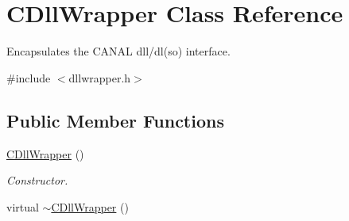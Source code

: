 \hypertarget{class_c_dll_wrapper}{
\section{CDllWrapper Class Reference}
\label{de/d52/class_c_dll_wrapper}
}


Encapsulates the CANAL dll/dl(so) interface.  




{\ttfamily \#include $<$dllwrapper.h$>$}

\subsection*{Public Member Functions}
\begin{DoxyCompactItemize}
\item 
\hypertarget{class_c_dll_wrapper_a760cc99e5ae00306d80e15373ea3b1a0}{
\hyperlink{class_c_dll_wrapper_a760cc99e5ae00306d80e15373ea3b1a0}{CDllWrapper} ()}
\label{de/d52/class_c_dll_wrapper_a760cc99e5ae00306d80e15373ea3b1a0}

\begin{DoxyCompactList}\small\item\em Constructor. \end{DoxyCompactList}\item 
\hypertarget{class_c_dll_wrapper_aa25bb4ca1bd947cdf65cf2bfba32ac22}{
virtual \hyperlink{class_c_dll_wrapper_aa25bb4ca1bd947cdf65cf2bfba32ac22}{$\sim$CDllWrapper} ()}
\label{de/d52/class_c_dll_wrapper_aa25bb4ca1bd947cdf65cf2bfba32ac22}


\end{DoxyCompactItemize}
